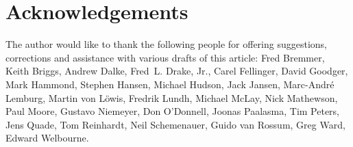 \documentclass{howto}
\begin{document}
\section{Acknowledgements}

The author would like to thank the following people for offering
suggestions, corrections and assistance with various drafts of this
article: Fred Bremmer, Keith Briggs, Andrew Dalke, Fred~L. Drake, Jr.,
Carel Fellinger, David Goodger, Mark Hammond, Stephen Hansen, Michael
Hudson, Jack Jansen, Marc-Andr\'e Lemburg, Martin von L\"owis, Fredrik
Lundh, Michael McLay, Nick Mathewson, Paul Moore, Gustavo Niemeyer,
Don O'Donnell, Joonas Paalasma, Tim Peters, Jens Quade, Tom Reinhardt, Neil
Schemenauer, Guido van Rossum, Greg Ward, Edward Welbourne.
\end{document}
